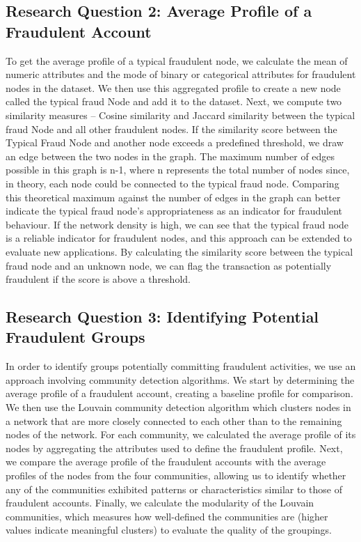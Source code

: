 \documentclass{styles/svproc}
\begin{document}
\subsection*{Research Question 2: Average Profile of a Fraudulent Account}
To get the average profile of a typical fraudulent node, we calculate the mean of numeric attributes and the mode of binary or categorical attributes for fraudulent nodes in the dataset. We then use this aggregated profile to create a new node called the typical fraud Node and add it to the dataset. Next, we compute two similarity measures -- Cosine similarity and Jaccard similarity between the typical fraud Node and all other fraudulent nodes. If the similarity score between the Typical Fraud Node and another node exceeds a predefined threshold, we draw an edge between the two nodes in the graph. The maximum number of edges possible in this graph is n-1, where n represents the total number of nodes since, in theory, each node could be connected to the typical fraud node. Comparing this theoretical maximum against the number of edges in the graph can better indicate the typical fraud node's appropriateness as an indicator for fraudulent behaviour. If the network density is high, we can see that the typical fraud node is a reliable indicator for fraudulent nodes, and this approach can be extended to evaluate new applications. By calculating the similarity score between the typical fraud node and an unknown node, we can flag the transaction as potentially fraudulent if the score is above a threshold.

\subsection*{Research Question 3: Identifying Potential Fraudulent Groups}
In order to identify groups potentially committing fraudulent activities, we use an approach involving community detection algorithms. We start by determining the average profile of a fraudulent account, creating a baseline profile for comparison. We then use the Louvain community detection algorithm which clusters nodes in a network that are more closely connected to each other than to the remaining nodes of the network. For each community, we calculated the average profile of its nodes by aggregating the attributes used to define the fraudulent profile. Next, we compare the average profile of the fraudulent accounts with the average profiles of the nodes from the four communities, allowing us to identify whether any of the communities exhibited patterns or characteristics similar to those of fraudulent accounts. Finally, we calculate the modularity of the Louvain communities, which measures how well-defined the communities are (higher values indicate meaningful clusters) to evaluate the quality of the groupings. 
\end{document}
